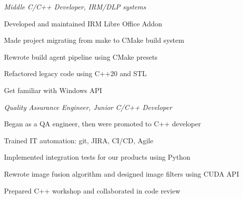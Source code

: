 \documentclass[
  a4paper, 
   maincolor=cvblue,
   sectioncolor=cvblue,
]{fortysecondscv}
\begin{document}





\newpage
\restoregeometry
{}\paperwidth

\makefrontsidebar

\begin{cvtable}
	{\textit{Middle C/C++ Developer, IRM/DLP systems}
	\normalsize 
	\begin{itemize-noindent}
		\item Developed and maintained IRM Libre Office Addon
		\item Made project migrating from make to CMake build system
		\item Rewrote build agent pipeline using CMake presets
		\item Refactored legacy code using C++20 and STL
		\item Get familiar with Windows API
	\end{itemize-noindent}
	}

	{\textit{Quality Assurance Engineer, Junior C/C++ Developer}
	\normalsize 
	\begin{itemize-noindent}
		\item Began as a QA engineer, then were promoted to C++ developer
		\item Trained IT automation: git, JIRA, CI/CD, Agile
		\item Implemented integration tests for our products using Python
		\item Rewrote image fusion algorithm and designed image filters using CUDA API
		\item Prepared C++ workshop and collaborated in code review
	\end{itemize-noindent}
	}
	

\end{cvtable}
\end{document}
